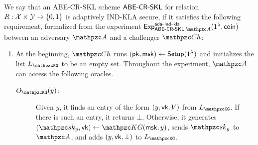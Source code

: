 \begin{definition}\label{def:ada_lessor_ABESKL}
We say that an ABE-CR-SKL scheme $\mathsf{ABE}\textrm{-}\mathsf{CR}\textrm{-}\mathsf{SKL}$ for relation $R:\mathcal{X}\times
\mathcal{Y} \to \{0,1\}$ is adaptively IND-KLA secure, if it satisfies the
following requirement, formalized from the experiment
$\expc{\ABESKL, \qA}{ada}{ind}{kla}(1^\secp,\coin)$ between an
adversary $\qA$ and a challenger $\qCh$:
        \begin{enumerate}
            \item At the beginning, $\qCh$ runs $(\mathsf{pk},\mathsf{msk})\leftarrow\mathsf{Setup}(1^\lambda)$
            and initializes the list $\List{\qKG}$ to be an empty set. 
            Throughout the experiment, $\qA$ can access the following oracles.
            \begin{description}
            \item[$\Oracle{\qKG}(y)$:] Given $y$, it finds an entry of the form $(y,\mathsf{vk},V)$ from $\List{\qKG}$. If there is such an entry, it returns $\bot$.
            Otherwise, it generates $(\qsk_y,\vk)\la\qKG(\msk,y)$,
            sends $\qsk_y$ to $\qA$, and adds $(y,\mathsf{vk},\bot)$ to $\List{\qKG}$.
            

\end{description}
\end{enumerate}
\end{definition}
